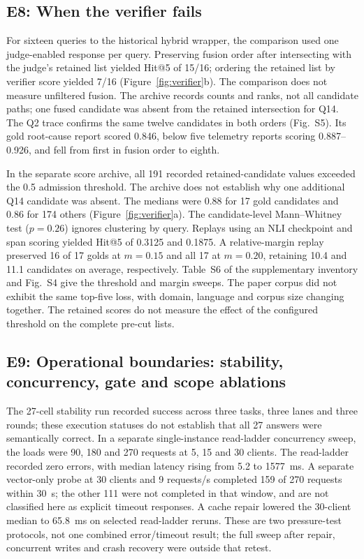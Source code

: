 \subsection{E8: When the verifier fails}
\label{sec:e6}
\label{sec:inflation}\label{sec:eval-verify}
For sixteen queries to the historical hybrid wrapper, the comparison used
one judge-enabled response per query. Preserving fusion order after
intersecting with the judge's retained list yielded Hit@5 of 15/16;
ordering the retained list by verifier score yielded 7/16
(Figure~\ref{fig:verifier}b). The comparison does not measure unfiltered
fusion. The archive records counts and ranks, not all candidate paths;
one fused candidate was absent from the retained intersection for Q14.
The Q2 trace confirms the same twelve candidates in both orders (Fig.~S5).
Its gold root-cause report scored 0.846, below five telemetry reports
scoring 0.887--0.926, and fell from first in fusion order to eighth.

In the separate score archive, all 191 recorded retained-candidate values
exceeded the 0.5 admission threshold. The archive does not establish why
one additional Q14 candidate was absent. The medians were 0.88 for 17 gold
candidates and 0.86 for 174 others (Figure~\ref{fig:verifier}a). The
candidate-level Mann--Whitney test ($p=0.26$) ignores clustering by query.
Replays using an NLI checkpoint and span scoring yielded Hit@5 of 0.3125
and 0.1875. A relative-margin replay preserved 16 of 17 golds at $m=0.15$
and all 17 at $m=0.20$, retaining 10.4 and 11.1 candidates on average,
respectively. Table~S6 of the supplementary inventory and Fig.~S4 give the
threshold and margin sweeps. The paper corpus did not exhibit the same
 top-five loss, with domain, language and corpus size changing together.
The retained scores do not measure the effect of the configured threshold
on the complete pre-cut lists.

\subsection{E9: Operational boundaries: stability, concurrency, gate and
scope ablations}
\label{sec:e7}
The 27-cell stability run recorded success across three tasks, three lanes
and three rounds; these execution statuses do not establish that all 27
answers were semantically correct. In a separate
single-instance read-ladder concurrency sweep, the loads were 90, 180 and
270 requests at 5, 15 and 30 clients. The read-ladder recorded zero errors,
with median latency rising from 5.2 to 1577~ms. A separate vector-only
probe at 30 clients and 9 requests/s completed 159 of 270 requests within
30~s; the other 111 were not completed in that window, and are not
classified here as explicit timeout responses. A cache repair lowered the
30-client median to 65.8~ms on selected read-ladder reruns. These are two
pressure-test protocols, not one combined error/timeout result; the full
sweep after repair, concurrent writes and crash recovery were outside that
retest.

